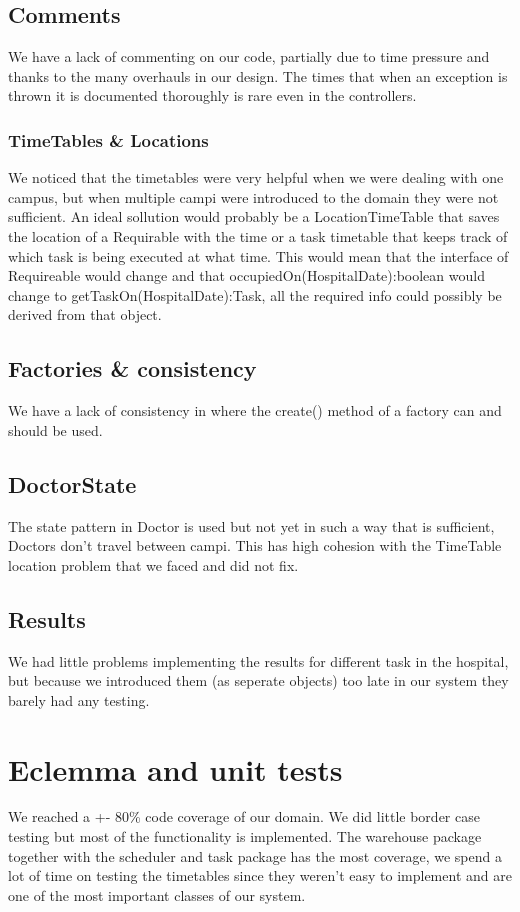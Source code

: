 \documentclass[12pt]{article}
\begin{document}
\subsection{Comments}
We have a lack of commenting on our code, partially due to time pressure and thanks to the many overhauls in our design. The times that when an exception is thrown it is documented thoroughly is rare even in the controllers.
\subsubsection{TimeTables \& Locations} We noticed that the timetables were very helpful when we were dealing with one campus, but when multiple campi were introduced to the domain they were not sufficient. An ideal sollution would probably be a LocationTimeTable that saves the location of a Requirable with the time or a task timetable that keeps track of which task is being executed at what time. This would mean that the interface of Requireable would change and that occupiedOn(HospitalDate):boolean would change to getTaskOn(HospitalDate):Task, all the required info could possibly be derived from that object.
\subsection{Factories \& consistency}
We have a lack of consistency in where the create() method of a factory can and should be used. 
\subsection{DoctorState}
The state pattern in Doctor is used but not yet in such a way that is sufficient, Doctors don't travel  between campi. This has high cohesion with the TimeTable location problem that we faced and did not fix.
\subsection{Results} 
We had little problems implementing the results for different task in the hospital, but because we introduced them (as seperate objects) too late in our system they barely had any testing.
\section{Eclemma and unit tests}
We reached a +- 80\%  code coverage of our domain. We did little border case testing but most of the functionality is implemented. The warehouse package together with the scheduler and task package has the most coverage, we spend a lot of time on testing the timetables since they weren't easy to implement and are one of the most important classes of our system.
\end{document}
